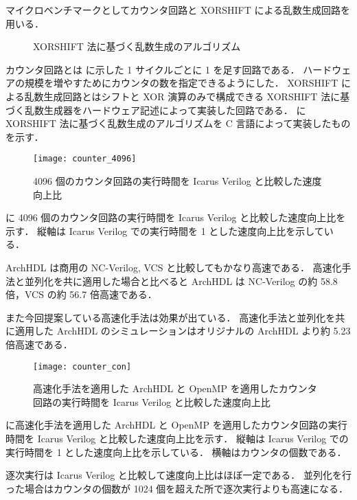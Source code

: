 マイクロベンチマークとしてカウンタ回路と XORSHIFT による乱数生成回路を用いる．

\begin{figure}[t]
 
 \caption{XORSHIFT 法に基づく乱数生成のアルゴリズム}
 \label{src:xorshift_alg}
\end{figure}

カウンタ回路とは  に示した 1 サイクルごとに 1 を足す回路である．
ハードウェアの規模を増やすためにカウンタの数を指定できるようにした．
XORSHIFT による乱数生成回路とはシフトと XOR 演算のみで構成できる XORSHIFT 法に基づく乱数生成器をハードウェア記述によって実装した回路である．
 に XORSHIFT 法に基づく乱数生成のアルゴリズムを C 言語によって実装したものを示す．

\begin{figure}[t]
 \centering
 \texttt{[image: counter\_4096]}
 \caption{4096 個のカウンタ回路の実行時間を Icarus Verilog と比較した速度向上比}
 \label{fig:counter4096}
\end{figure}

 に 4096 個のカウンタ回路の実行時間を Icarus Verilog と比較した速度向上比を示す．
縦軸は Icarus Verilog での実行時間を 1 とした速度向上比を示している．

ArchHDL は商用の NC-Verilog, VCS と比較してもかなり高速である．
高速化手法と並列化を共に適用した場合と比べると ArchHDL は NC-Verilog の約 58.8 倍，VCS の約 56.7 倍高速である．

また今回提案している高速化手法は効果が出ている．
高速化手法と並列化を共に適用した ArchHDL のシミュレーションはオリジナルの ArchHDL より約 5.23 倍高速である．



\begin{figure}[t]
 \centering
 \texttt{[image: counter\_con]}
 \caption{高速化手法を適用した ArchHDL と OpenMP を適用したカウンタ回路の実行時間を Icarus Verilog と比較した速度向上比}
 \label{fig:counter_con}
\end{figure}

 に高速化手法を適用した ArchHDL と OpenMP を適用したカウンタ回路の実行時間を Icarus Verilog と比較した速度向上比を示す．
縦軸は Icarus Verilog での実行時間を 1 とした速度向上比を示している．
横軸はカウンタの個数である．

逐次実行は Icarus Verilog と比較して速度向上比はほぼ一定である．
並列化を行った場合はカウンタの個数が 1024 個を超えた所で逐次実行よりも高速になる．

